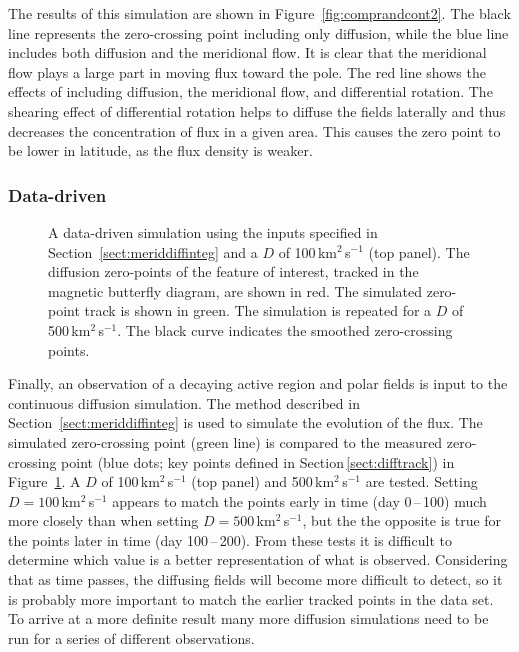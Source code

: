 The results of this simulation are shown in Figure~\ref{fig:comprandcont2}. The black line represents the zero-crossing point including only diffusion, while the blue line includes both diffusion and the meridional flow. It is clear that the meridional flow plays a large part in moving flux toward the pole. The red line shows the effects of including diffusion, the meridional flow, and differential rotation. The shearing effect of differential rotation helps to diffuse the fields laterally and thus decreases the concentration of flux in a given area. This causes the zero point to be lower in latitude, as the flux density is weaker.

\subsubsection{Data-driven}\label{sect:simdatdriv}

\begin{figure}[!t]
\caption[Data-driven diffusion simulations.]{A data-driven simulation using the inputs specified in Section~\ref{sect:meriddiffinteg} and a $D$ of 100\,km$^2$\,s$^{-1}$ (top panel). The diffusion zero-points of the feature of interest, tracked in the magnetic butterfly diagram, are shown in red. The simulated zero-point track is shown in green. The simulation is repeated for a $D$ of 500\,km$^2$\,s$^{-1}$. The black curve indicates the smoothed zero-crossing points.}
\label{fig:datasimcomp}
\end{figure}


Finally, an observation of a decaying active region and polar fields is input to the continuous diffusion simulation. The method described in Section~\ref{sect:meriddiffinteg} is used to simulate the evolution of the flux. The simulated zero-crossing point (green line) is compared to the measured zero-crossing point (blue dots; key points defined in Section\,\ref{sect:difftrack}) in Figure~\ref{fig:datasimcomp}. 
A $D$ of 100\,km$^2$\,s$^{-1}$ (top panel) and 500\,km$^2$\,s$^{-1}$ are tested. Setting $D=100$\,km$^2$\,s$^{-1}$ appears to match the points early in time (day 0\,--\,100) much more closely than when setting $D=500$\,km$^2$\,s$^{-1}$, but the the opposite is true for the points later in time (day 100\,--\,200). From these tests it is difficult to determine which value is a better representation of what is observed. Considering that as time passes, the diffusing fields will become more difficult to detect, so it is probably more important to match the earlier tracked points in the data set. To arrive at a more definite result many more diffusion simulations need to be run for a series of different observations.
 
